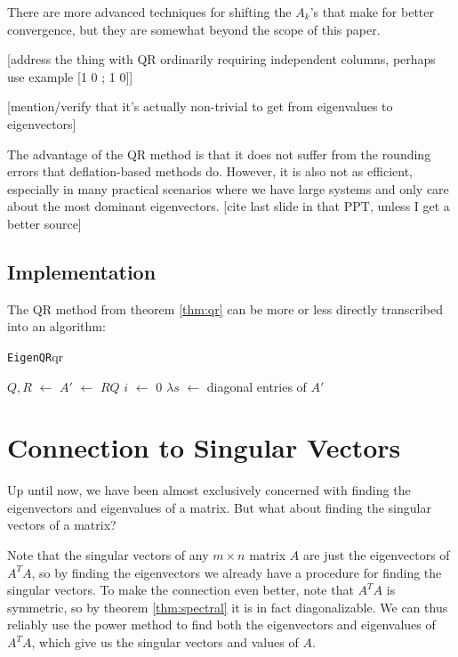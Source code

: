 \documentclass{article}
\def\store{$\leftarrow$ }
\begin{document}
There are more advanced techniques for shifting the $A_k$'s that make for better convergence, but they are somewhat beyond the scope of this paper.

[address the thing with QR ordinarily requiring independent columns, perhaps use example [1 0 ; 1 0]]

[mention/verify that it's actually non-trivial to get from eigenvalues to eigenvectors]

The advantage of the QR method is that it does not suffer from the rounding errors that deflation-based methods do. However, it is also not as efficient, especially in many practical scenarios where we have large systems and only care about the most dominant eigenvectors. [cite last slide in that PPT, unless I get a better source]

\subsection{Implementation}
The QR method from theorem \ref{thm:qr} can be more or less directly transcribed into an algorithm:

\begin{algo}{\texttt{EigenQR}}{qr}
  \begin{algorithm}[H]

    \BlankLine
    $Q,R$ \store {}\;
    $A'$ \store $RQ$\;
    $i$ \store $0$
    \While{$\lVert A' - A\rVert > \varepsilon$ {\normalfont and } $i < N$}{
      $Q,R$ \store \QRDecomposition{$A'$}\;
      $A$ \store $A'$\;
      $A'$ \store $RQ$\;
      $i$ \store $i + 1$\;
    }
    $\lambda s$ \store diagonal entries of $A'$\;
  \end{algorithm}
\end{algo}

\section{Connection to Singular Vectors}
Up until now, we have been almost exclusively concerned with finding the eigenvectors and eigenvalues of a matrix. But what about finding the singular vectors of a matrix?

Note that the singular vectors of any $m \times n$ matrix $A$ are just the eigenvectors of $A^TA$, so by finding the eigenvectors we already have a procedure for finding the singular vectors. To make the connection even better, note that $A^TA$ is symmetric, so by theorem \ref{thm:spectral} it is in fact diagonalizable. We can thus reliably use the power method to find both the eigenvectors and eigenvalues of $A^TA$, which give us the singular vectors and values of $A$.
\end{document}
